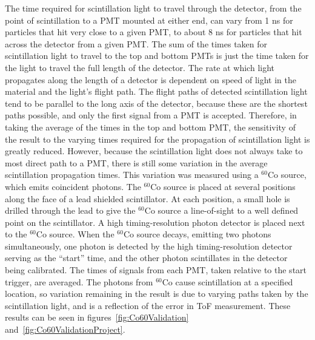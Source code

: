 The time required for scintillation light to travel through the detector, from the point of scintillation to a PMT mounted at either end, can vary from 1 ns for particles that hit very close to a given PMT, to about 8 ns for particles that hit across the detector from a given PMT.
The sum of the times taken for scintillation light to travel to the top and bottom PMTs is just the time taken for the light to travel the full length of the detector.
The rate at which light propagates along the length of a detector is dependent on speed of light in the material and the light's flight path.
The flight paths of detected scintillation light tend to be parallel to the long axis of the detector, because these are the shortest paths possible, and only the first signal from a PMT is accepted.
Therefore, in taking the average of the times in the top and bottom PMT, the sensitivity of the result to the varying times required for the propagation of scintillation light is greatly reduced.
However, because the scintillation light does not always take to most direct path to a PMT, there is still some variation in the average scintillation propagation times.
This variation was measured using a $^{60}$Co source, which emits coincident photons.
The $^{60}$Co source is placed at several positions along the face of a lead shielded scintillator.
At each position, a small hole is drilled through the lead to give the $^{60}$Co source a line-of-sight to a well defined point on the scintillator.
A high timing-resolution photon detector is placed next to the $^{60}$Co source.
When the $^{60}$Co source decays, emitting two photons simultaneously, one photon is detected by the high timing-resolution detector serving as the ``start'' time, and the other photon scintillates in the detector being calibrated.
The times of signals from each PMT, taken relative to the start trigger, are averaged.
The photons from $^{60}$Co cause scintillation at a specified location, so variation remaining in the result is due to varying paths taken by the scintillation light, and is a reflection of the error in ToF measurement.
These results can be seen in figures~\ref{fig:Co60Validation} and~\ref{fig:Co60ValidationProject}.
